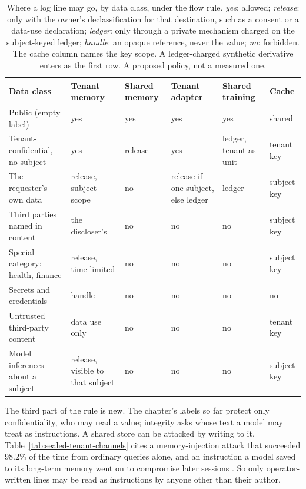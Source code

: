 \begin{table}[H]\centering\footnotesize
\caption{Where a log line may go, by data class, under the flow rule.
\emph{yes}: allowed; \emph{release}: only with the owner's declassification
for that destination, such as a consent or a data-use declaration;
\emph{ledger}: only through a private mechanism charged on the subject-keyed
ledger; \emph{handle}: an opaque reference, never the value; \emph{no}:
forbidden. The cache column names the key scope. A ledger-charged synthetic
derivative enters as the first row. A proposed policy, not a measured one.}
\label{tab:sealed-tenant-policy}
\begin{tabularx}{\textwidth}{@{}>{\raggedright\arraybackslash}p{2.6cm} >{\raggedright\arraybackslash}X >{\raggedright\arraybackslash}X >{\raggedright\arraybackslash}X >{\raggedright\arraybackslash}X >{\raggedright\arraybackslash}X@{}}
\toprule
Data class & Tenant memory & Shared memory & Tenant adapter & Shared training & Cache \\
\midrule
Public (empty label) & yes & yes & yes & yes & shared \\
Tenant-confidential, no subject & yes & release & yes & ledger, tenant as unit & tenant key \\
The requester's own data & release, subject scope & no & release if one subject, else ledger & ledger & subject key \\
Third parties named in content & the discloser's & no & no & no & subject key \\
Special category: health, finance & release, time-limited & no & no & no & subject key \\
Secrets and credentials & handle & no & no & no & no \\
Untrusted third-party content & data use only & no & no & no & tenant key \\
Model inferences about a subject & release, visible to that subject & no & no & no & subject key \\
\bottomrule
\end{tabularx}
\end{table}

The third part of the rule is new. The chapter's labels so far protect only
confidentiality, who may read a value; integrity asks whose text a model may
treat as instructions. A shared store can be attacked by writing to it.
Table~\ref{tab:sealed-tenant-channels} cites a memory-injection attack that
succeeded 98.2\% of the time from ordinary queries alone, and an instruction a model saved to its long-term memory went on to
compromise later sessions . So only
operator-written lines may be read as instructions by anyone other than their
author.

